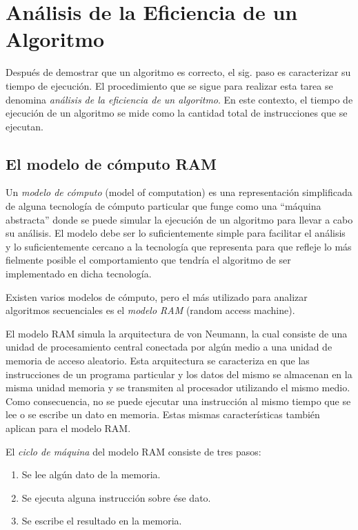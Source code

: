 \chapter{Análisis de la Eficiencia de un Algoritmo}

Después de demostrar que un algoritmo es correcto, el sig. paso es
caracterizar su tiempo de ejecución. El procedimiento que se sigue
para realizar esta tarea se denomina \emph{análisis de la eficiencia 
de un algoritmo}. En este contexto, el tiempo de ejecución de
un algoritmo se mide como la cantidad total de instrucciones que se
ejecutan. 

\section{El modelo de cómputo RAM}

Un \emph{modelo de cómputo} (model of computation) es una
representación simplificada de alguna tecnología de cómputo particular
que funge como una ``máquina abstracta'' donde se puede simular
la ejecución de un algoritmo para llevar a cabo su análisis. El modelo
debe ser lo suficientemente simple para facilitar el análisis y lo
suficientemente cercano a la tecnología que representa para que refleje
lo más fielmente posible el comportamiento que tendría el algoritmo
de ser implementado en dicha tecnología. 

Existen varios modelos de cómputo, pero el más utilizado para analizar
algoritmos secuenciales es el \emph{modelo RAM }(random access machine). 

El modelo RAM simula la arquitectura de von Neumann, la cual consiste
de una unidad de procesamiento central conectada por algún medio a
una unidad de memoria de acceso aleatorio. Esta arquitectura se caracteriza
en que las instrucciones de un programa particular y los datos del
mismo se almacenan en la misma unidad memoria y se transmiten al procesador
utilizando el mismo medio. Como consecuencia, no se puede ejecutar
una instrucción al mismo tiempo que se lee o se escribe un dato en
memoria. Estas mismas características también aplican para el modelo
RAM.

El \emph{ciclo de máquina} del modelo RAM consiste de tres pasos: 

\begin{enumerate}
    \item Se lee algún dato de la memoria. 
    \item Se ejecuta alguna instrucción sobre ése dato.
    \item Se escribe el resultado en la memoria. 
\end{enumerate}

